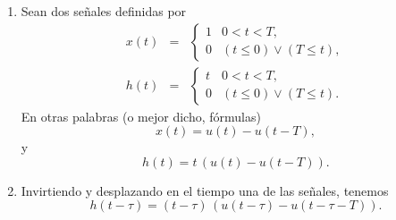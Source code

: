 \begin{enumerate}

\item Sean dos se\~{n}ales definidas por
\begin{eqnarray}
        x\left( t\right) &=&
                \left\{ \begin{array}{cc}
                                1 & 0<t<T,                                                       \\ 
                                0 & \left( t\leq 0\right) \vee \left( T\leq t\right) ,
                        \end{array}
                \right.                                                                       \\
        h\left( t\right) &=&
                \left\{ \begin{array}{cc}
                                t & 0<t<T,                                                       \\ 
                                0 & \left( t\leq 0\right) \vee \left( T\leq t\right).
                        \end{array}
                \right.
\end{eqnarray}
En otras palabras (o mejor dicho, f\'{o}rmulas)
\begin{equation}
        x\left( t\right) = u\left( t\right) -u\left( t-T\right) ,
\end{equation}
y
\begin{equation}
        h\left( t\right) = t \, \left( u\left( t\right) -u\left( t-T\right) \right).
\end{equation}

\item Invirtiendo y desplazando en el tiempo una de las se\~{n}ales, tenemos
\begin{equation}
        h\left( t-\tau \right) = 
        \left( t-\tau \right) \, \left( u\left( t-\tau \right)-u\left( t-\tau -T\right) \right) .
\end{equation}


\end{enumerate}
